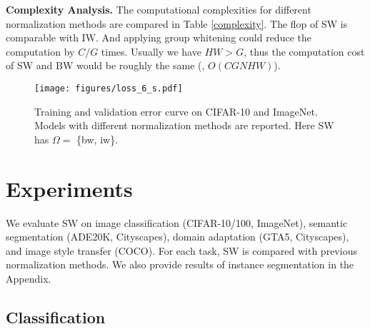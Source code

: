 \documentclass[10pt,twocolumn,letterpaper]{article}
\begin{document}
\noindent\textbf{Complexity Analysis.}
The computational complexities for different normalization methods are compared in Table \ref{complexity}.
The flop of SW is comparable with IW.
And applying group whitening could reduce the computation by $C/G$ times.
Usually we have $HW > G$, thus the computation cost of SW and BW would be roughly the same (\ie, $O(CGNHW)$).

 	
\begin{figure*}[t!]
	\centering
	\texttt{[image: figures/loss\_6\_s.pdf]}
	\vspace{-10pt}
	\caption{Training and validation error curve on CIFAR-10 and ImageNet. Models with different normalization methods are reported. Here SW has \(\Omega = \) \{bw, iw\}.}
	\label{error_curve}
	\vspace{-5pt}
\end{figure*}


\section{Experiments}

We evaluate SW on image classification (CIFAR-10/100, ImageNet), semantic segmentation (ADE20K, Cityscapes), domain adaptation (GTA5, Cityscapes), and image style transfer (COCO).
For each task, SW is compared with previous normalization methods.
We also provide results of instance segmentation in the Appendix.


\subsection{Classification}
\end{document}
